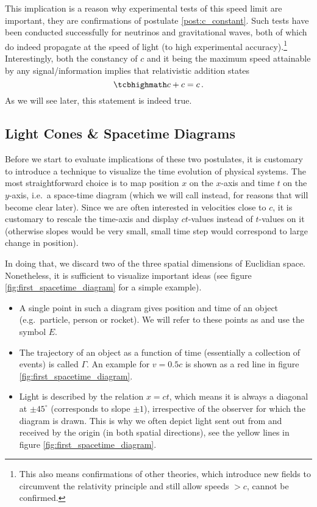 This implication is a reason why experimental tests of this speed limit are important, they are confirmations of postulate \ref{post:c_constant}. Such tests have been conducted successfully for neutrinos and gravitational waves, both of which do indeed propagate at the speed of light (to high experimental accuracy).\footnote{This also means confirmations of other theories, which introduce new fields to circumvent the relativity principle and still allow speeds $> c$, cannot be confirmed.} Interestingly, both the constancy of $c$ and it being the maximum speed attainable by any signal/information implies that relativistic addition states
\begin{equation}
	\eqbox{
	c + c = c
	} \, .
\end{equation}
As we will see later, this statement is indeed true.



		\subsection{Light Cones \& Spacetime Diagrams}
Before we start to evaluate implications of these two postulates, it is customary to introduce a technique to visualize the time evolution of physical systems. The most straightforward choice is to map position $x$ on the $x$-axis and time $t$ on the $y$-axis, i.e.~a space-time diagram (which we will call  instead, for reasons that will become clear later). Since we are often interested in velocities close to $c$, it is customary to rescale the time-axis and display $ct$-values instead of $t$-values on it (otherwise slopes would be very small, small time step would correspond to large change in position).

In doing that, we discard two of the three spatial dimensions of Euclidian space. Nonetheless, it is sufficient to visualize important ideas (see figure \ref{fig:first_spacetime_diagram} for a simple example).
\begin{itemize}
	\item A single point in such a diagram gives position and time of an object (e.g.~particle, person or rocket). We will refer to these points as  and use the symbol $E$.


	\item The trajectory of an object as a function of time (essentially a collection of events) is called  $\Gamma$. An example for $v = 0.5 c$ is shown as a red line in figure \ref{fig:first_spacetime_diagram}.


	\item Light is described by the relation $x = ct$, which means it is always a diagonal at $\pm 45^\circ$ (corresponds to slope $\pm 1$), irrespective of the observer for which the diagram is drawn. This is why we often depict light sent out from and received by the origin (in both spatial directions), see the yellow lines in figure \ref{fig:first_spacetime_diagram}.
\end{itemize}

